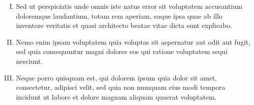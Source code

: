 

\begin{enumerate}[I.]
    \item Sed ut perspiciatis unde omnis iste natus error sit voluptatem accusantium doloremque laudantium, totam rem aperiam, eaque ipsa quae ab illo inventore veritatis et quasi architecto beatae vitae dicta sunt explicabo. 

    \item Nemo enim ipsam voluptatem quia voluptas sit aspernatur aut odit aut fugit, sed quia consequuntur magni dolores eos qui ratione voluptatem sequi nesciunt. 
    
    \item Neque porro quisquam est, qui dolorem ipsum quia dolor sit amet, consectetur, adipisci velit, sed quia non numquam eius modi tempora incidunt ut labore et dolore magnam aliquam quaerat voluptatem. 
\end{enumerate}
